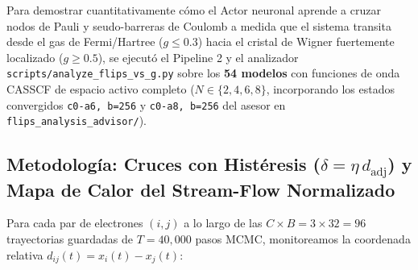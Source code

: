 \documentclass[10pt,a4paper]{article}
\begin{document}
Para demostrar cuantitativamente cómo el Actor neuronal aprende a cruzar nodos de Pauli y seudo-barreras de Coulomb a medida que el sistema transita desde el gas de Fermi/Hartree ($g \le 0.3$) hacia el cristal de Wigner fuertemente localizado ($g \ge 0.5$), se ejecutó el Pipeline 2 y el analizador \texttt{scripts/analyze\_flips\_vs\_g.py} sobre los \textbf{54 modelos} con funciones de onda CASSCF de espacio activo completo ($N \in \{2, 4, 6, 8\}$, incorporando los estados convergidos \texttt{c0-a6, b=256} y \texttt{c0-a8, b=256} del asesor en \texttt{flips\_analysis\_advisor/}).




\subsection{Metodología: Cruces con Histéresis ($\delta = \eta\,d_{\mathrm{adj}}$) y Mapa de Calor del Stream-Flow Normalizado}

Para cada par de electrones $(i, j)$ a lo largo de las $C \times B = 3 \times 32 = 96$ trayectorias guardadas de $T = 40,000$ pasos MCMC, monitoreamos la coordenada relativa $d_{ij}(t) = x_i(t) - x_j(t)$:
\end{document}
